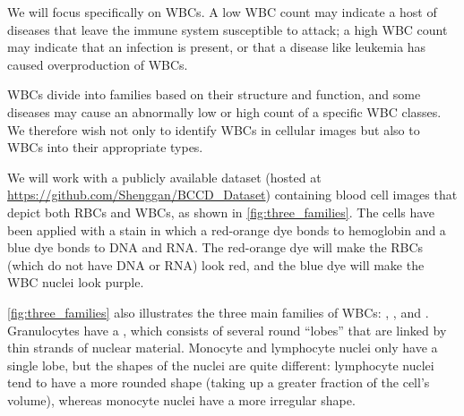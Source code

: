 We will focus specifically on WBCs. A low WBC count may indicate a host of diseases that leave the immune system susceptible to attack; a high WBC count may indicate that an infection is present, or that a disease like leukemia has caused overproduction of WBCs.

WBCs divide into families based on their structure and function, and some diseases may cause an abnormally low or high count of a specific WBC classes. We therefore wish not only to identify WBCs in cellular images but also to  WBCs into their appropriate types.

We will work with a publicly available dataset (hosted at \url{https://github.com/Shenggan/BCCD_Dataset}) containing blood cell images that depict both RBCs and WBCs, as shown in \autoref{fig:three_families}. The cells have been applied with a stain in which a red-orange dye bonds to hemoglobin and a blue dye bonds to DNA and RNA. The red-orange dye will make the RBCs (which do not have DNA or RNA) look red, and the blue dye will make the WBC nuclei look purple.

\autoref{fig:three_families} also illustrates the three main families of WBCs: , , and .  Granulocytes have a , which consists of several round “lobes” that are linked by thin strands of nuclear material. Monocyte and lymphocyte nuclei only have a single lobe, but the shapes of the nuclei are quite different: lymphocyte nuclei tend to have a more rounded shape (taking up a greater fraction of the cell’s volume), whereas monocyte nuclei have a more irregular shape.\\

